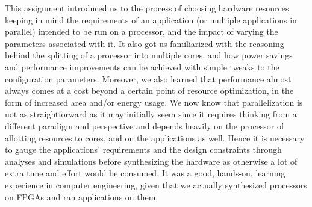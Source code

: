 \documentclass[conference]{IEEEtran}
\begin{document}
This assignment introduced us to the process of choosing hardware resources keeping in mind the requirements of an application (or multiple applications in parallel) intended to be run on a processor, and the impact of varying the parameters associated with it. It also got us familiarized with the reasoning behind the splitting of a processor into multiple cores, and how power savings and performance improvements can be achieved with simple tweaks to the configuration parameters. Moreover, we also learned that performance almost always comes at a cost beyond a certain point of resource optimization, in the form of increased area and/or energy usage. We now know that parallelization is not as straightforward as it may initially seem since it requires thinking from a different paradigm and perspective and depends heavily on the processor of allotting resources to cores, and on the applications as well. Hence it is necessary to gauge the applications' requirements and the design constraints through analyses and simulations before synthesizing the hardware as otherwise a lot of extra time and effort would be consumed. It was a good, hands-on, learning experience in computer engineering, given that we actually synthesized processors on FPGAs and ran applications on them.
\newpage
\end{document}
